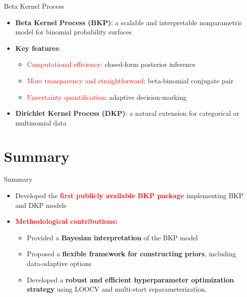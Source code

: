 \documentclass[
  ignorenonframetext,
  aspectratio=169]{beamer}
\newcommand{\0}{\mathbf{0}}
\newcommand{\1}{\mathbf{1}}
\newcommand{\pkg}[1]{{\fontseries{m}\fontseries{b}\selectfont #1}}
\begin{document}
\begin{frame}{Beta Kernel Process}
\protect{}\label{beta-kernel-process}
\begin{itemize}
\item
  \textbf{Beta Kernel Process (BKP)}: a scalable and interpretable
  nonparametric model for binomial probability surfaces
  \citep{Goetschalckx:2011, MacKenzie2014, Rolland2019BKP}
\item
  \textbf{Key features}:

  \begin{itemize}
  \item
    \textcolor{red}{Computational efficiency}: closed-form posterior
    inference
  \item
    \textcolor{red}{More transparency and straightforward}:
    beta-binomial conjugate pair
  \item
    \textcolor{red}{Uncertainty quantification}: adaptive
    decision-marking
  \end{itemize}
\item
  \textbf{Dirichlet Kernel Process (DKP)}: a natural extension for
  categorical or multinomial data
\end{itemize}
\end{frame}

\section{Summary}\label{summary}

\begin{frame}{Summary}
\protect{}\label{summary-1}
\begin{itemize}
\item
  Developed the
  \textcolor{red}{\bf first publicly available \pkg{BKP} package}
  implementing BKP and DKP models
\item
  \textcolor{red}{\bf Methodological contributions:}

  \begin{itemize}
  \item
    Provided a \textbf{Bayesian interpretation} of the BKP model
  \item
    Proposed a \textbf{flexible framework for constructing priors},
    including data-adaptive options
  \item
    Developed a \textbf{robust and efficient hyperparameter optimization
    strategy} using LOOCV and multi-start reparameterization.
  \end{itemize}
\end{itemize}
\end{frame}
\end{document}
